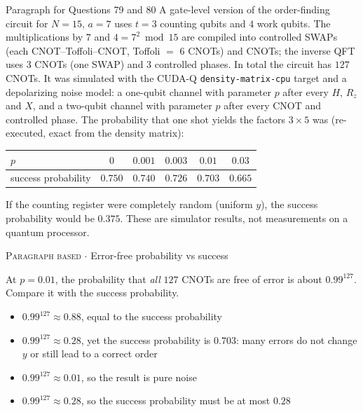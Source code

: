 \documentclass[11pt,a4paper]{article}
\newcommand{\optlabel}[1]{\textbf{(#1)}}
\newcommand{\correctlabel}[1]{\textcolor{okgreen}{\textbf{(#1)}\,\ding{51}}}
\newenvironment{qitem}[1]{\begin{list}{}{\setlength{\leftmargin}{3.3em}\setlength{\labelwidth}{3.1em}%
  \setlength{\labelsep}{0.2em}\setlength{\topsep}{3pt}\setlength{\parsep}{3pt}}\item[\textbf{Q.#1}\hfill]}{\end{list}}
\newcommand{\qmeta}[2]{{\footnotesize\color{black!60}\textsc{#1} \;$\cdot$\; #2}\par}
\begin{document}
\begin{passagebox}{Paragraph for Questions 79 and 80}
A gate-level version of the order-finding circuit for $N = 15$, $a = 7$ uses $t = 3$ counting qubits and $4$ work qubits. The
multiplications by $7$ and $4 = 7^2 \bmod 15$ are compiled into controlled SWAPs (each CNOT--Toffoli--CNOT, Toffoli $=$ 6 CNOTs) and CNOTs; the
inverse QFT uses $3$ CNOTs (one SWAP) and $3$ controlled phases. In total the circuit has $127$ CNOTs. It was simulated with the CUDA-Q
\texttt{density-matrix-cpu} target and a depolarizing noise model: a one-qubit channel with parameter $p$ after every $H$, $R_z$ and $X$, and a
two-qubit channel with parameter $p$ after every CNOT and controlled phase. The probability that one shot yields the factors $3 \times 5$ was
(re-executed, exact from the density matrix):
\begin{center}\begin{tabular}{lccccc}\toprule
$p$ & $0$ & $0.001$ & $0.003$ & $0.01$ & $0.03$\\\midrule
success probability & $0.750$ & $0.740$ & $0.726$ & $0.703$ & $0.665$\\\bottomrule
\end{tabular}\end{center}
If the counting register were completely random (uniform $y$), the success probability would be $0.375$. These are simulator results, not
measurements on a quantum processor.
\end{passagebox}
\begin{qitem}{79}
\qmeta{Paragraph based}{Error-free probability vs success}
At $p = 0.01$, the probability that \emph{all} $127$ CNOTs are free of error is about $0.99^{127}$. Compare it with the success probability.
\begin{itemize}[leftmargin=2.6em, labelsep=0.4em, itemsep=2pt, topsep=3pt]
\item[\optlabel{A}] $0.99^{127} \approx 0.88$, equal to the success probability
\item[\correctlabel{B}] $0.99^{127} \approx 0.28$, yet the success probability is $0.703$: many errors do not change $y$ or still lead to a correct order
\item[\optlabel{C}] $0.99^{127} \approx 0.01$, so the result is pure noise
\item[\optlabel{D}] $0.99^{127} \approx 0.28$, so the success probability must be at most $0.28$
\end{itemize}
\end{qitem}
\end{document}
